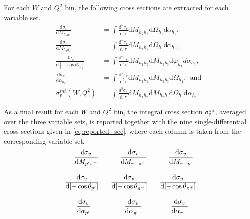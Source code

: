 For each $W$ and $Q^{2}$ bin, the following cross sections are extracted for each variable set.
\begin{equation}
\begin{aligned}
\frac{\textrm{d}\sigma_{v}}{\textrm{d}M_{h_{1}h_{2}}} & =\int\frac{\textrm{d}^{5}\sigma_{v}}{\textrm{d}^{5}\tau}\textrm{d}M_{h_{2}h_{3}}\textrm{d}\Omega_{h_{1}}\textrm{d}\alpha_{h_{1}}, \\
\frac{\textrm{d}\sigma_{v}}{\textrm{d}M_{h_{2}h_{3}}} & =\int\frac{\textrm{d}^{5}\sigma_{v}}{\textrm{d}^{5}\tau}\textrm{d}M_{h_{1}h_{2}}\textrm{d}\Omega_{h_{1}}\textrm{d}\alpha_{h_{1}}, \\
\frac{\textrm{d}\sigma_{v}}{\textrm{d}[-\cos\theta_{h_{1}}]} & =\int\frac{\textrm{d}^{5}\sigma_{v}}{\textrm{d}^{5}\tau}\textrm{d}M_{h_{1}h_{2}}\textrm{d}M_{h_{2}h_{3}}\textrm{d}\varphi_{h_{1}}d\alpha_{h_{1}}, \\
\frac{\textrm{d}\sigma_{v}}{\textrm{d}\alpha_{h_{1}}} & =\int\frac{\textrm{d}^{5}\sigma_{v}}{\textrm{d}^{5}\tau}\textrm{d}M_{h_{1}h_{2}}\textrm{d}M_{h_{2}h_{3}}\textrm{d}\Omega_{h_{1}},~~\text{and}\\
\sigma_{v}^{int} (W, Q^{2}) &= \int \frac{d^{5}\sigma_{v}}{\textrm{d}^{5}\tau}\textrm{d}M_{h_{1}h_{2}}\textrm{d}M_{h_{2}h_{3}}\textrm{d}\Omega_{h_{1}}\textrm{d}\alpha_{h_{1}}.
\end{aligned}
\label{inegr5diff}
\end{equation}


As a final result for each $W$ and $Q^{2}$ bin, the integral cross section $\sigma_{v}^{int}$, averaged over the three variable sets, is reported together with the nine single-differential cross sections given in \eqref{eq:reported_sec}, where each column is taken from the corresponding variable set.
\begin{equation}
\begin{aligned}
&~~~~~~\frac{\textrm{\textrm{d}}\sigma_{v}}{\textrm{d}M_{p'\pi^{+}}}&&~~~~~~\frac{\textrm{d}\sigma_{v}}{\textrm{d}M_{\pi^{-}\pi^{+}}}&&~~~~~~\frac{\textrm{d}\sigma_{v}}{\textrm{d}M_{\pi^{-}p'}}\\[8pt] 
&~~\frac{\textrm{d}\sigma_{v}}{\textrm{d}[-\cos\theta_{p'}]}&&~~\frac{\textrm{d}\sigma_{v}}{\textrm{d}[-\cos\theta_{\pi^{-}}]}&&~~\frac{\textrm{d}\sigma_{v}}{\textrm{d}[-\cos\theta_{\pi^{+}}]}\\[8pt] 
&~~~~~~~\frac{\textrm{d}\sigma_{v}}{\textrm{d}\alpha_{p'}}&&~~~~~~~~\frac{\textrm{d}\sigma_{v}}{\textrm{d}\alpha_{\pi^{-}}}&&~~~~~~~\frac{\textrm{d}\sigma_{v}}{\textrm{d}\alpha_{\pi^{+}}}
\end{aligned}
\label{eq:reported_sec}
\end{equation}

